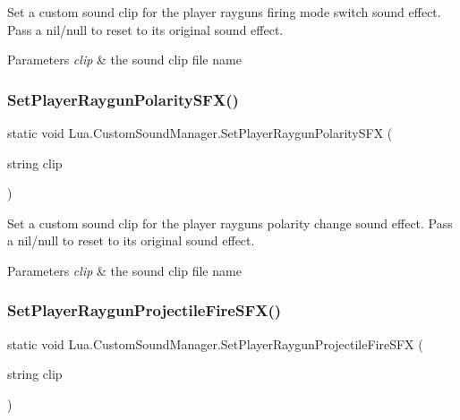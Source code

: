 Set a custom sound clip for the player raygun\textquotesingle{}s firing mode switch sound effect. Pass a nil/null to reset to its original sound effect. 


\begin{DoxyParams}{Parameters}
{\em clip} & the sound clip file name\\
\hline
\end{DoxyParams}
\mbox{\label{class_lua_1_1_custom_sound_manager_aeb74ff0f630bbb90bada33635f382d66}} 
\subsubsection{\texorpdfstring{SetPlayerRaygunPolaritySFX()}{SetPlayerRaygunPolaritySFX()}}
{\footnotesize\ttfamily static void Lua.\+Custom\+Sound\+Manager.\+Set\+Player\+Raygun\+Polarity\+S\+FX (\begin{DoxyParamCaption}\item[{string}]{clip }\end{DoxyParamCaption})\hspace{0.3cm}{\ttfamily [static]}}



Set a custom sound clip for the player raygun\textquotesingle{}s polarity change sound effect. Pass a nil/null to reset to its original sound effect. 


\begin{DoxyParams}{Parameters}
{\em clip} & the sound clip file name\\
\hline
\end{DoxyParams}
\mbox{\label{class_lua_1_1_custom_sound_manager_acb7307ffeed459bb90bf63f20f5fa3b9}} 
\subsubsection{\texorpdfstring{SetPlayerRaygunProjectileFireSFX()}{SetPlayerRaygunProjectileFireSFX()}}
{\footnotesize\ttfamily static void Lua.\+Custom\+Sound\+Manager.\+Set\+Player\+Raygun\+Projectile\+Fire\+S\+FX (\begin{DoxyParamCaption}\item[{string}]{clip }\end{DoxyParamCaption})\hspace{0.3cm}{\ttfamily [static]}}



